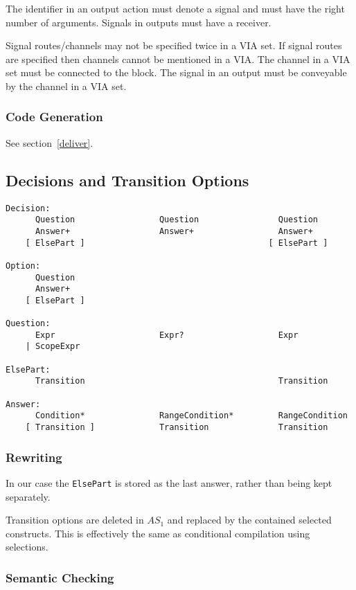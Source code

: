The identifier in an output action must denote a signal and
must have the right number of arguments.
Signals in outputs must have a receiver.

Signal routes/channels may not be specified twice in a VIA set.
If signal routes are specified then channels cannot be
mentioned in a VIA.
The channel in a VIA set must be connected to the block.
The signal in an output must be conveyable by the channel in a
VIA set.

\subsubsection{Code Generation}

See section~\ref{deliver}.

\subsection{Decisions and Transition Options}

\begin{verbatim}
Decision:
      Question                 Question                Question
      Answer+                  Answer+                 Answer+
    [ ElsePart ]                                     [ ElsePart ]

Option:
      Question
      Answer+
    [ ElsePart ]

Question:
      Expr                     Expr?                   Expr
    | ScopeExpr

ElsePart:
      Transition                                       Transition

Answer:
      Condition*               RangeCondition*         RangeCondition
    [ Transition ]             Transition              Transition
\end{verbatim}

\subsubsection{Rewriting}

In our case the {\tt ElsePart} is stored as the last answer, rather
than being kept separately.

Transition options are deleted in $AS_1$ and replaced by the
contained selected constructs. This is effectively the same as
conditional compilation using selections.

\subsubsection{Semantic Checking}

